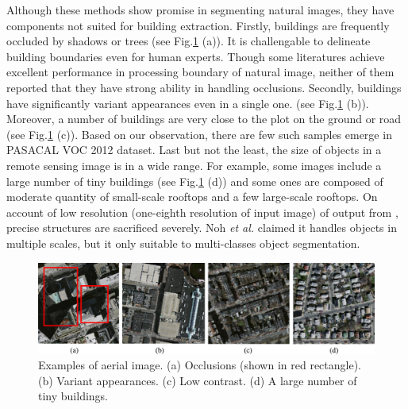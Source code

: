 \documentclass[runningheads]{llncs}
\begin{document}
   Although these methods show promise in segmenting natural images, they have components not suited for building extraction. Firstly, buildings are frequently occluded by shadows or trees (see Fig.\ref{fig:AerialImages} (a)). It is challengable to delineate building boundaries even for human experts. Though some literatures \cite{chen14semantic,Zheng2015Conditional} achieve excellent performance in processing boundary of natural image, neither of them reported that they have strong ability in handling occlusions. Secondly, buildings have significantly variant appearances even in a single one. (see Fig.\ref{fig:AerialImages} (b)). Moreover, a number of buildings are very close to the plot on the ground or road (see Fig.\ref{fig:AerialImages} (c)). Based on our observation, there are few such samples emerge in PASACAL VOC 2012 \cite{pascal-voc-2012} dataset. Last but not the least, the size of objects in a remote sensing image is in a wide range. For example, some images include a large number of tiny buildings (see Fig.\ref{fig:AerialImages} (d)) and some ones are composed of moderate quantity of small-scale rooftops and a few  large-scale rooftops. On account of low resolution (one-eighth resolution of input image) of output from \cite{Long2014Fully}, precise structures are sacrificed severely. Noh \textit{et al.} \cite{Noh2015Learning} claimed  it handles objects in multiple scales, but it only suitable to multi-classes object segmentation. 


\begin{figure}
\centering
\label{fig:AerialImages}
\includegraphics[width=120mm]{AerialImages}
\caption{Examples of aerial image. (a) Occlusions (shown in red rectangle). (b) Variant appearances. (c) Low contrast. (d) A large number of tiny buildings. }
\end{figure}      
            
\end{document}
